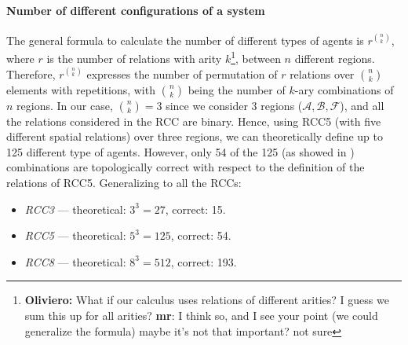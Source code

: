 \documentclass[conference]{IEEEtran}
\newcommand{\fixnote}[2]{\textbf{\color{red}{FIX}}\footnote{{\bf #1:} #2}}
\newcommand{\assertionRegion}{\mathcal{A}}
\newcommand{\beliefRegion}{\mathcal{B}}
\newcommand{\factRegion}{\mathcal{F}}
\begin{document}
\paragraph{Number of different configurations of a system}
The general formula to calculate the number of different types of agents is
$r^{\binom{n}{k}}$, where $r$ is the number of relations with arity $k$\fixnote{Oliviero}{What if our calculus uses relations of different arities? I guess we sum this up for all arities? {\bf mr}: I think so, and I see your point (we could generalize the formula) maybe it's not that important? not sure},
between $n$ different regions. Therefore, $r^{\binom{n}{k}}$
expresses the number of permutation of $r$
relations over ${\binom{n}{k}}$ elements with repetitions, 
with ${\binom{n}{k}}$ being the number of
$k$-ary combinations of $n$ regions.
In our case, $\binom{n}{k}=3$ since we consider $3$ regions 
($\assertionRegion,\beliefRegion,\factRegion$), and all the relations
considered in the RCC are binary.  Hence, using RCC5 (with five different
spatial relations) over three regions, we can theoretically define up to 125
different type of agents. However, only 54 of the 125 (as showed in
\autocite{improvingRCC}) combinations are topologically correct with respect to
the definition of the relations of RCC5. Generalizing to all the RCCs:

\begin{itemize}%
\item \emph{RCC3} --- theoretical: $3^3=27$,  correct: 15.
\item \emph{RCC5} --- theoretical: $5^3=125$, correct: 54.
\item \emph{RCC8} --- theoretical: $8^3=512$, correct: 193.
\end{itemize}
\end{document}
